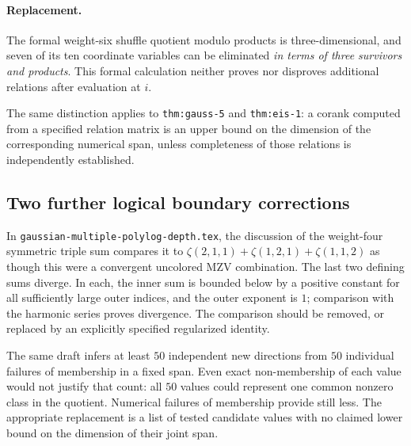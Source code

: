 \paragraph{Replacement.}
The formal weight-six shuffle quotient modulo products is
three-dimensional, and seven of its ten coordinate variables can be
eliminated \emph{in terms of three survivors and products}.
This formal calculation neither proves nor disproves additional
relations after evaluation at $i$.

The same distinction applies to \texttt{thm:gauss-5} and
\texttt{thm:eis-1}: a corank computed from a specified relation matrix is
an upper bound on the dimension of the corresponding numerical span,
unless completeness of those relations is independently established.

\subsection{Two further logical boundary corrections}
\label{audit:poly:other}

In \texttt{gaussian-multiple-polylog-depth.tex}, the discussion of the
weight-four symmetric triple sum compares it to
$\zeta(2,1,1)+\zeta(1,2,1)+\zeta(1,1,2)$ as though this were a convergent
uncolored MZV combination. The last two defining sums diverge. In each,
the inner sum is bounded below by a positive constant for all sufficiently
large outer indices, and the outer exponent is $1$; comparison with the
harmonic series proves divergence. The comparison should be removed,
or replaced by an explicitly specified regularized identity.

The same draft infers at least $50$ independent new directions from
$50$ individual failures of membership in a fixed span. Even exact
non-membership of each value would not justify that count: all $50$
values could represent one common nonzero class in the quotient.
Numerical failures of membership provide still less. The appropriate
replacement is a list of tested candidate values with no claimed lower
bound on the dimension of their joint span.
